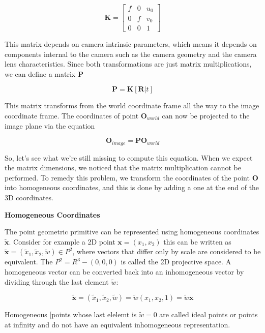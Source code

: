 \begin{equation}
\mathbf{K}=
\begin{bmatrix}
f & 0 & u_0 \\
0 & f & v_0 \\
0 & 0 & 1
\end{bmatrix}
\end{equation}

This matrix depends on
camera intrinsic parameters, which means it depends on components internal to the camera such as the camera geometry and the camera lens
characteristics. Since both transformations are just matrix multiplications, we can define a matrix $\mathbf{P}$

\begin{equation}
\mathbf{P} = \mathbf{K}[\mathbf{R}|t]
\end{equation}


This matrix transforms from the world coordinate frame all the way to
the image coordinate frame. The coordinates of point $\mathbf{O}_{world}$ can now be projected to the image plane via the equation

\begin{equation}
\mathbf{O}_{image} = \mathbf{P} \mathbf{O}_{world}
\end{equation}

So, let's see what we're still missing to compute this equation. When we expect
the matrix dimensions, we noticed that
the matrix multiplication cannot be performed. To remedy this problem, we transform the coordinates of the point $\mathbf{O}$ into
homogeneous coordinates, and this is done by adding
a one at the end of the 3D coordinates. 


\begin{framed}
\begin{remark}{\textbf{Homogeneous Coordinates}}

The point geometric primitive can be represented using homogeneous coordinates $\tilde{\mathbf{x}}$. Consider for example a 2D point
$\mathbf{x} = (x_1, x_2)$ this can be written as $\tilde{\mathbf{x}} = (\tilde{x}_1, \tilde{x}_2, \tilde{w}) \in P^2 $, where vectors
that differ only by scale are considered to be equivalent. The $P^2 = R^3 - (0,0,0)$ is called the 2D projective space. A homogeneous
vector can be converted back into an inhomogeneous vector by dividing through the last element $\tilde{w}$:

\begin{equation}
\tilde{\mathbf{x}} = (\tilde{x}_1, \tilde{x}_2, \tilde{w}) = \tilde{w}(x_1, x_2, 1) = \tilde{w}\mathbf{x}
\end{equation}

Homogeneous [points whose last elelemt is $\tilde{w}=0$ are called ideal points or points at infinity and do not have an equivalent
inhomogeneous representation.
\end{remark}
\end{framed}


